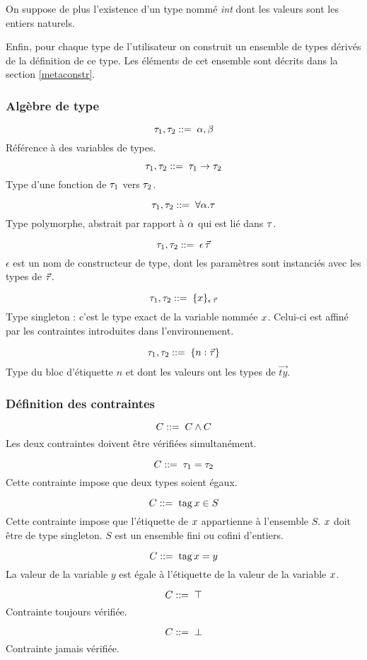 On suppose de plus l'existence d'un type nommé \emph{int} dont les valeurs sont
les entiers naturels.

Enfin, pour chaque type de l'utilisateur on construit un ensemble de types
dérivés de la définition de ce type. Les éléments de cet ensemble sont décrits
dans la section \ref{metaconstr}.

\subsubsection{Algèbre de type}

$$\tau_1, \tau_2 ::= \; \alpha, \beta$$
%
Référence à des variables de types.

$$\tau_1, \tau_2 ::= \;  \tau_1 \rightarrow \tau_2$$
%
Type d'une fonction de $\tau_1$ vers $\tau_2$.

$$\tau_1, \tau_2 ::= \;  \forall \alpha. \tau$$
%
Type polymorphe, abstrait par rapport à $\alpha$ qui est lié dans $\tau$.

$$\tau_1, \tau_2 ::= \;  \epsilon \, \vec{\tau}$$
%
$\epsilon$ est un nom de constructeur de type, dont les paramètres sont
instanciés avec les types de $\vec{\tau}$.

$$\tau_1, \tau_2 ::= \;  \{ x \}_{\epsilon \, \vec{\tau}}$$
%
Type singleton : c'est le type exact de la variable nommée $x$. Celui-ci est
affiné par les contraintes introduites dans l'environnement.

$$\tau_1, \tau_2 ::= \;  \{ n: \vec{\tau} \}$$
%
Type du bloc d'étiquette $n$ et dont les valeurs ont les types de $\vec{ty}$.

\subsubsection{Définition des contraintes}

$$C ::= \; C \wedge C$$
%
Les deux contraintes doivent être vérifiées simultanément.

$$C ::= \;  \tau_1 = \tau_2$$
%
Cette contrainte impose que deux types soient égaux.

$$C ::= \;  \operatorname{tag} x \in S$$
%
Cette contrainte impose que l'étiquette de $x$ appartienne à l'ensemble $S$.
$x$ doit être de type singleton. $S$ est un ensemble fini ou cofini
d'entiers.

$$C ::= \;  \operatorname{tag} x = y$$
%
La valeur de la variable $y$ est égale à l'étiquette de la valeur de la
variable $x$.

$$C ::= \;  \top$$
%
Contrainte toujours vérifiée.

$$C ::= \;  \bot$$
%
Contrainte jamais vérifiée.

